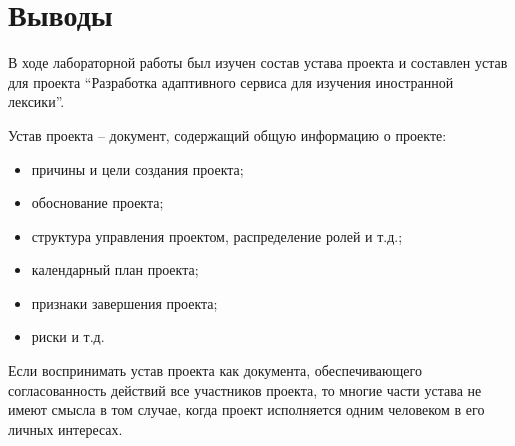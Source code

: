 \documentclass[a4paper,14pt]{extarticle}
\begin{document}
\section*{Выводы}
В ходе лабораторной работы был изучен состав устава проекта и составлен устав
для проекта \enquote{Разработка адаптивного сервиса для изучения иностранной
лексики}.

Устав проекта -- документ, содержащий общую информацию о проекте:
\begin{itemize}
    \item причины и цели создания проекта;
    \item обоснование проекта;
    \item структура управления проектом, распределение ролей и т.д.;
    \item календарный план проекта;
    \item признаки завершения проекта;
    \item риски и т.д.
\end{itemize}

Если воспринимать устав проекта как документа, обеспечивающего согласованность
действий все участников проекта, то многие части устава не имеют смысла в том
случае, когда проект исполняется одним человеком в его личных интересах.
\end{document}
